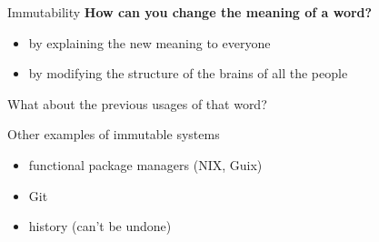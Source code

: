 \documentclass{beamer}
\begin{document}
\begin{frame}{Immutability} \pause
  {\large \textbf{How can you change the meaning of a word?}} \pause
  \ \\
  \begin{itemize}
  \item by explaining the new meaning to everyone \pause
  \item by modifying the structure of the brains of all the people \pause
  \end{itemize}
  {\footnotesize What about the previous usages of that word?}
\end{frame}

\begin{frame}{Other examples of immutable systems} \pause
  \begin{itemize}
    \item functional package managers (NIX, Guix) \pause
    \item Git \pause
    \item history (can't be undone)
  \end{itemize}
\end{frame}
\end{document}
